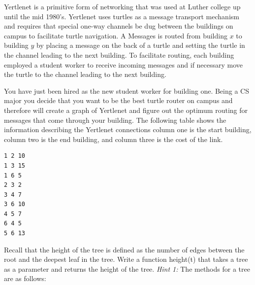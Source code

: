 \documentclass[11pt]{exam}
\begin{document}
\begin{questions}
\newpage
\question
Yertlenet is a primitive form of networking that was used at Luther college up until the mid 1980's.  Yertlenet uses turtles as a message transport mechanism and requires that special one-way channels be dug between the buildings on campus to facilitate turtle navigation. A Messages is routed from building $x$ to building $y$ by placing a message on the back of a turtle and setting the turtle in the channel leading to the next building.  To facilitate routing, each building employed a student worker to receive incoming messages and if necessary move the turtle to the channel leading to the next building.  

You have just been hired as the new student worker for building one. Being a CS major you decide that you want to be the best turtle router on campus and therefore will create a graph of Yertlenet and figure out the optimum routing for messages that come through your building. The following table shows the information describing the Yertlenet connections column one is the start building, column two is the end building, and column three is the cost of the link.

\begin{verbatim}
1 2 10
1 3 15
1 6 5
2 3 2
3 4 7
3 6 10
4 5 7
6 4 5
5 6 13
\end{verbatim}


\newpage
\question[10]  Recall that the height of the tree is defined as the number of edges between the root and the deepest leaf in the tree.  Write a function height(t) that takes a tree as a parameter and returns the height of the tree.  \textit{Hint 1:} The methods for a tree are as follows:
\begin{itemize}


\end{itemize}
\end{questions}
\end{document}
